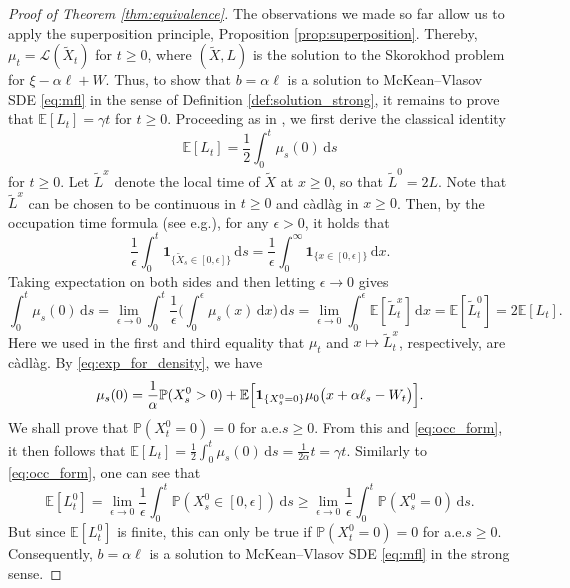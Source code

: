 \documentclass[11pt, a4paper]{article}
\theoremstyle{plain}
\theoremstyle{definition}
\theoremstyle{remark}
\numberwithin{equation}{section}
\newcommand{\ev}{\mathbb{E}}
\newcommand{\pr}{\mathbb{P}}
\renewcommand{\L}{\mathcal{L}}
\renewcommand{\d}{\mathrm{d}}
\renewcommand{\bf}[1]{\mathbf{#1}}
\begin{document}
\begin{proof}[Proof of Theorem \ref{thm:equivalence}]
The observations we made so far allow us to apply the superposition principle, Proposition \ref{prop:superposition}. Thereby, $\mu_t = \L(\tilde{X}_t)$ for $t \geq 0$, where $(\tilde{X}, L)$ is the solution to the Skorokhod problem for $\xi - \alpha \ell + W$. Thus, to show that $b = \alpha \ell$ is a solution to McKean--Vlasov SDE \eqref{eq:mfl} in the sense of Definition \ref{def:solution_strong}, it remains to prove that $\ev[L_t] = \gamma t$ for $t \geq 0$. Proceeding as in \cite[Lemma 1.18]{baker_loc_times_2025}, we first derive the classical identity
\begin{equation*}
    \ev[L_t] = \frac{1}{2} \int_0^t \mu_s(0) \, \d s
\end{equation*}
for $t \geq 0$. Let $\tilde{L}^x$ denote the local time of $\tilde{X}$ at $x \geq 0$, so that $\tilde{L}^0 = 2 L$. Note that $\tilde{L}^x$ can be chosen to be continuous in $t \geq 0$ and c\`adl\`ag in $x \geq 0$. Then, by the occupation time formula (see e.g.\@ \cite[Chapter VI, Corollary 1.6]{revuz_cmbm_1999}), for any $\epsilon > 0$, it holds that
\begin{equation*}
    \frac{1}{\epsilon}\int_0^t \bf{1}_{\{\tilde{X}_s \in [0, \epsilon]\}} \, \d s = \frac{1}{\epsilon}\int_0^{\infty}  \bf{1}_{\{x \in [0, \epsilon]\}} \, \d x.
\end{equation*}
Taking expectation on both sides and then letting $\epsilon \to 0$ gives
\begin{equation} \label{eq:occ_form}
    \int_0^t \mu_s(0) \, \d s = \lim_{\epsilon \to 0} \int_0^t \frac{1}{\epsilon} \biggl(\int_0^{\epsilon} \mu_s(x) \, \d x\biggr) \, \d s = \lim_{\epsilon \to 0} \int_0^{\epsilon} \ev[\tilde{L}^x_t] \, \d x = \ev[\tilde{L}^0_t] = 2\ev[L_t].
\end{equation}
Here we used in the first and third equality that $\mu_t$ and $x \mapsto \tilde{L}^x_t$, respectively, are c\`adl\`ag. By \eqref{eq:exp_for_density}, we have
\begin{equation*}
    \mu_s(0) = \frac{1}{\alpha} \pr(X^0_s > 0) + \ev\Bigl[\bf{1}_{\{X^0_s = 0\}} \mu_0\bigl(x + \alpha \ell_s - W_t\bigr)\Bigr].
\end{equation*}
We shall prove that $\pr(X^0_t = 0) = 0$ for a.e.\@ $s \geq 0$. From this and \eqref{eq:occ_form}, it then follows that $\ev[L_t] = \frac{1}{2} \int_0^t \mu_s(0) \, \d s = \frac{1}{2\alpha} t = \gamma t$. Similarly to \eqref{eq:occ_form}, one can see that
\begin{equation*}
    \ev[L^0_t] = \lim_{\epsilon \to 0} \frac{1}{\epsilon} \int_0^t \pr(X^0_s \in [0, \epsilon]) \, \d s \geq \lim_{\epsilon \to 0} \frac{1}{\epsilon} \int_0^t \pr(X^0_s = 0) \, \d s.
\end{equation*}
But since $\ev[L^0_t]$ is finite, this can only be true if $\pr(X^0_t = 0) = 0$ for a.e.\@ $s \geq 0$. Consequently, $b = \alpha \ell$ is a solution to McKean--Vlasov SDE \eqref{eq:mfl} in the strong sense.


\end{proof}
\end{document}
